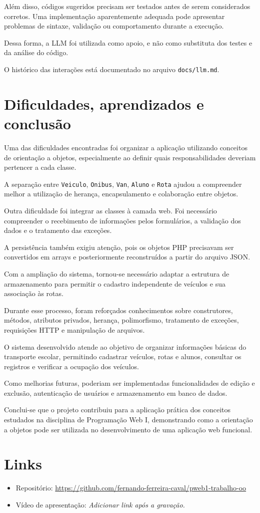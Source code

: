 \documentclass[12pt,a4paper]{article}
\begin{document}
Além disso, códigos sugeridos precisam ser testados antes de serem considerados corretos. Uma implementação aparentemente adequada pode apresentar problemas de sintaxe, validação ou comportamento durante a execução.

Dessa forma, a LLM foi utilizada como apoio, e não como substituta dos testes e da análise do código.

O histórico das interações está documentado no arquivo \texttt{docs/llm.md}.

\section{Dificuldades, aprendizados e conclusão}

Uma das dificuldades encontradas foi organizar a aplicação utilizando conceitos de orientação a objetos, especialmente ao definir quais responsabilidades deveriam pertencer a cada classe.

A separação entre \texttt{Veiculo}, \texttt{Onibus}, \texttt{Van}, \texttt{Aluno} e \texttt{Rota} ajudou a compreender melhor a utilização de herança, encapsulamento e colaboração entre objetos.

Outra dificuldade foi integrar as classes à camada web. Foi necessário compreender o recebimento de informações pelos formulários, a validação dos dados e o tratamento das exceções.

A persistência também exigiu atenção, pois os objetos PHP precisavam ser convertidos em arrays e posteriormente reconstruídos a partir do arquivo JSON.

Com a ampliação do sistema, tornou-se necessário adaptar a estrutura de armazenamento para permitir o cadastro independente de veículos e sua associação às rotas.

Durante esse processo, foram reforçados conhecimentos sobre construtores, métodos, atributos privados, herança, polimorfismo, tratamento de exceções, requisições HTTP e manipulação de arquivos.

O sistema desenvolvido atende ao objetivo de organizar informações básicas do transporte escolar, permitindo cadastrar veículos, rotas e alunos, consultar os registros e verificar a ocupação dos veículos.

Como melhorias futuras, poderiam ser implementadas funcionalidades de edição e exclusão, autenticação de usuários e armazenamento em banco de dados.

Conclui-se que o projeto contribuiu para a aplicação prática dos conceitos estudados na disciplina de Programação Web I, demonstrando como a orientação a objetos pode ser utilizada no desenvolvimento de uma aplicação web funcional.

\section*{Links}

\begin{itemize}
    \item Repositório:
    \url{https://github.com/fernando-ferreira-caval/pweb1-trabalho-oo}

    \item Vídeo de apresentação:
    \textit{Adicionar link após a gravação.}
\end{itemize}
\end{document}
